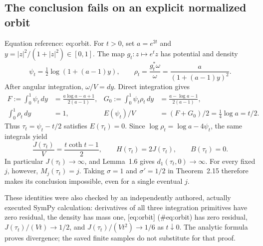 \documentclass[10pt]{article}
\begin{document}
\subsection*{The conclusion fails on an explicit normalized orbit}
Equation reference: eq:orbit. For \(t>0\), set \(a=e^{2t}\) and \(y=|z|^2/(1+|z|^2)\in[0,1]\). The map \(g_t:z\mapsto e^tz\) has potential and density \[\psi_t=\tfrac12\log(1+(a-1)y),\qquad
 \rho_t=\frac{g_t^*\omega}{\omega}
       =\frac{a}{(1+(a-1)y)^2}.\] After angular integration, \(\omega/V=dy\). Direct integration gives \[\begin{aligned}
 F:=\int_0^1\psi_t\,dy&=\frac{a\log a-a+1}{2(a-1)},&
 G_0:=\int_0^1\psi_t\rho_t\,dy&=\frac{a-\log a-1}{2(a-1)},\\
 \int_0^1\rho_t\,dy&=1,&
 E(\psi_t)/V&=(F+G_0)/2=\tfrac14\log a=t/2.\end{aligned}\] Thus \(\tau_t=\psi_t-t/2\) satisfies \(E(\tau_t)=0\). Since \(\log\rho_t=\log a-4\psi_t\), the same integrals yield \[
 \frac{J(\tau_t)}{V}=\frac{t\coth t-1}{2},\qquad
 H(\tau_t)=2J(\tau_t),\qquad B(\tau_t)=0.\] In particular \(J(\tau_t)\to\infty\), and Lemma 1.6 gives \(d_1(\tau_t,0)\to\infty\). For every fixed \(j\), however, \(M_j(\tau_t)=j\). Taking \(\sigma=1\) and \(\sigma'=1/2\) in Theorem 2.15 therefore makes its conclusion impossible, even for a single eventual \(j\).\par
These identities were also checked by an independently authored, actually executed SymPy calculation: derivatives of all three integration primitives have zero residual, the density has mass one, [eq:orbit] (\#eq:orbit) has zero residual, \(J(\tau_t)/(Vt)\to1/2\), and \(J(\tau_t)/(Vt^2)\to1/6\) as \(t\downarrow0\). The analytic formula proves divergence; the saved finite samples do not substitute for that proof.\par
\end{document}
